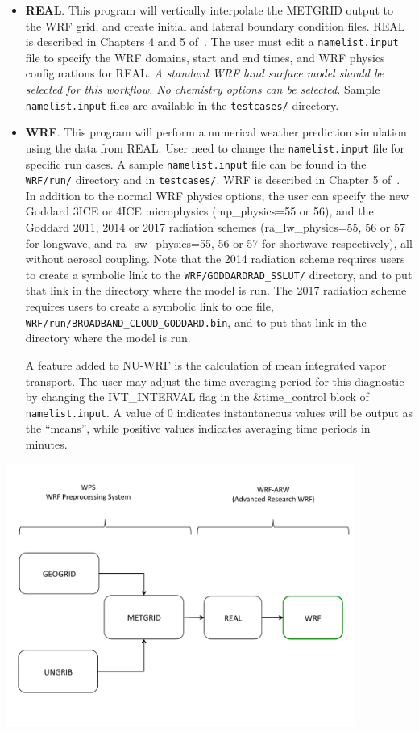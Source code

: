 \begin{itemize}
\item \textbf{REAL}. This program will vertically interpolate the METGRID 
  output to the WRF grid, and create initial and lateral boundary condition
  files. REAL is described in Chapters 4 and 5 of~\cite{ref:ArwUserGuide}. 
  The user must edit a \texttt{namelist.input} file to specify the WRF domains,
  start and end times, and WRF physics configurations for REAL. 
  \emph{A standard WRF land surface model should be selected for this 
  workflow. No chemistry options can be selected.}  Sample 
  \texttt{namelist.input} files are available in the \texttt{testcases/} 
  directory.
\item \textbf{WRF}. This program will perform a numerical weather prediction
  simulation using the data from REAL. User need to change the 
  \texttt{namelist.input} file for specific run cases. A sample 
  \texttt{namelist.input} file can be found in the \texttt{WRF/run/} 
  directory and in \texttt{testcases/}. WRF is described in Chapter 5 
  of~\cite{ref:ArwUserGuide}. In addition to the normal WRF physics options, 
  the user can specify the new Goddard 3ICE or 4ICE microphysics 
  (mp\_physics=55 or 56), and the Goddard 2011, 2014 or 2017 radiation schemes 
  (ra\_lw\_physics=55, 56 or 57 for longwave, and ra\_sw\_physics=55, 56 or 57 for 
  shortwave respectively), all without aerosol coupling. Note that the 2014 radiation 
  scheme requires users to create a symbolic link to the 
  \texttt{WRF/GODDARDRAD\_SSLUT/} directory, and to put that link in the 
  directory where the model is run.  The 2017 radiation 
  scheme requires users to create a symbolic link to one file,
  \texttt{WRF/run/BROADBAND\_CLOUD\_GODDARD.bin}, and to put that link in the 
  directory where the model is run.

  A feature added to NU-WRF is the calculation of mean integrated
  vapor transport. The user may adjust the time-averaging period for this
  diagnostic by changing the IVT\_INTERVAL flag in the 
  \&time\_control block of \texttt{namelist.input}. A value of 0 indicates
  instantaneous values will be output as the ``means'', while positive
  values indicates averaging time periods in minutes.
  
\end{itemize}
\centerline{\includegraphics[width=4.5in]{basic-workflow}}

